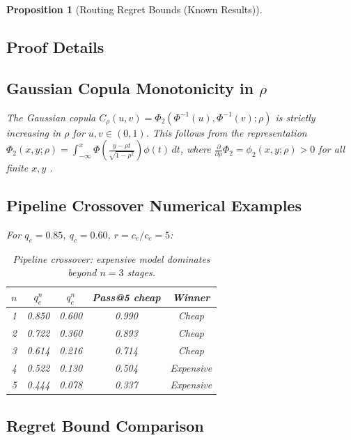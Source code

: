 \documentclass[11pt, a4paper, logo, copyright]{googledeepmind}
\newtheorem{proposition}{Proposition}[section]
\begin{document}
\begin{proposition}[Routing Regret Bounds (Known Results)]
\begin{appendices}

\section{Proof Details}
\label{app:proofs}

\subsection{Gaussian Copula Monotonicity in $\rho$}

The Gaussian copula $C_\rho(u,v) = \Phi_2(\Phi^{-1}(u), \Phi^{-1}(v); \rho)$ is strictly increasing in $\rho$ for $u, v \in (0,1)$. This follows from the representation $\Phi_2(x, y; \rho) = \int_{-\infty}^{x} \Phi\left(\frac{y - \rho t}{\sqrt{1 - \rho^2}}\right) \phi(t)\, dt$, where $\frac{\partial}{\partial \rho} \Phi_2 = \phi_2(x, y; \rho) > 0$ for all finite $x, y$ \citep{nelsen2006copulas}.

\subsection{Pipeline Crossover Numerical Examples}

For $q_e = 0.85$, $q_c = 0.60$, $r = c_e / c_c = 5$:

\begin{table}[htbp]
\centering
\begin{tabular}{ccccc}
\toprule
$n$ & $q_e^n$ & $q_c^n$ & Pass@5 cheap & Winner \\
\midrule
1 & 0.850 & 0.600 & 0.990 & Cheap \\
2 & 0.722 & 0.360 & 0.893 & Cheap \\
3 & 0.614 & 0.216 & 0.714 & Cheap \\
4 & 0.522 & 0.130 & 0.504 & Expensive \\
5 & 0.444 & 0.078 & 0.337 & Expensive \\
\bottomrule
\end{tabular}
\caption{Pipeline crossover: expensive model dominates beyond $n = 3$ stages.}
\end{table}

\subsection{Regret Bound Comparison}


\end{appendices}
\end{proposition}
\end{document}
